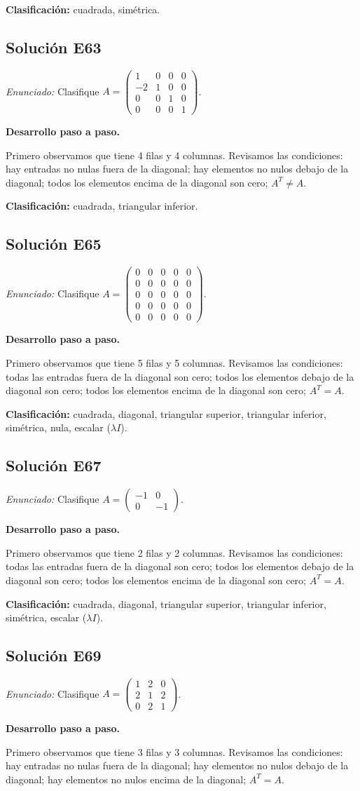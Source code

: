 \documentclass[12pt]{article}
\theoremstyle{remark}
\newcommand{\solucion}[2]{\Needspace{11\baselineskip}\subsection*{Solución E#1}\noindent\textit{Enunciado:} #2\par\medskip\noindent\textbf{Desarrollo paso a paso.}\par\medskip}
\begin{document}
\textbf{Clasificación:} cuadrada, simétrica.


\medskip

\solucion{63}{Clasifique $A=\begin{pmatrix}1&0&0&0\\-2&1&0&0\\0&0&1&0\\0&0&0&1\end{pmatrix}$.}
Primero observamos que tiene 4 filas y 4 columnas. Revisamos las condiciones: hay entradas no nulas fuera de la diagonal; hay elementos no nulos debajo de la diagonal; todos los elementos encima de la diagonal son cero; $A^T\ne A$.

\textbf{Clasificación:} cuadrada, triangular inferior.


\medskip

\solucion{65}{Clasifique $A=\begin{pmatrix}0&0&0&0&0\\0&0&0&0&0\\0&0&0&0&0\\0&0&0&0&0\\0&0&0&0&0\end{pmatrix}$.}
Primero observamos que tiene 5 filas y 5 columnas. Revisamos las condiciones: todas las entradas fuera de la diagonal son cero; todos los elementos debajo de la diagonal son cero; todos los elementos encima de la diagonal son cero; $A^T=A$.

\textbf{Clasificación:} cuadrada, diagonal, triangular superior, triangular inferior, simétrica, nula, escalar ($\lambda I$).


\medskip

\solucion{67}{Clasifique $A=\begin{pmatrix}-1&0\\0&-1\end{pmatrix}$.}
Primero observamos que tiene 2 filas y 2 columnas. Revisamos las condiciones: todas las entradas fuera de la diagonal son cero; todos los elementos debajo de la diagonal son cero; todos los elementos encima de la diagonal son cero; $A^T=A$.

\textbf{Clasificación:} cuadrada, diagonal, triangular superior, triangular inferior, simétrica, escalar ($\lambda I$).


\medskip

\solucion{69}{Clasifique $A=\begin{pmatrix}1&2&0\\2&1&2\\0&2&1\end{pmatrix}$.}
Primero observamos que tiene 3 filas y 3 columnas. Revisamos las condiciones: hay entradas no nulas fuera de la diagonal; hay elementos no nulos debajo de la diagonal; hay elementos no nulos encima de la diagonal; $A^T=A$.
\end{document}
